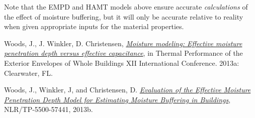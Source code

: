 Note that the EMPD and HAMT models above ensure accurate \emph{calculations} of the effect of moisture buffering, but it will only be accurate relative to reality when given appropriate inputs for the material properties.

Woods, J., J. Winkler, D. Christensen, \href{http://www.techstreet.com/products/1868073}{\emph{Moisture modeling: Effective moisture penetration depth versus effective capacitance}}, in Thermal Performance of the Exterior Envelopes of Whole Buildings XII International Conference. 2013a: Clearwater, FL.

Woods, J., Winkler, J, and Christensen, D. \href{http://www.nlr.gov/docs/fy13osti/57441.pdf}{\emph{Evaluation of the Effective Moisture Penetration Depth Model for Estimating Moisture Buffering in Buildings}}, NLR/TP-5500-57441, 2013b.
